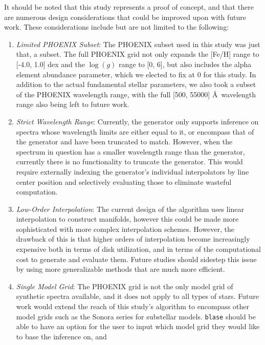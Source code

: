 \documentclass[twocolumn]{aastex631}
\begin{document}
It should be noted that this study represents a proof of concept, and that 
there are numerous design considerations that could be improved upon with 
future work. These considerations include but are not limited to the 
following:
\begin{enumerate}[label=-]
    \item \textit{Limited PHOENIX Subset}: The PHOENIX subset used in this 
    study was just that, a subset. The full PHOENIX grid not only expands 
    the [Fe/H] range to [-4.0, 1.0] dex and the $\log(g)$ range to [0, 6], 
    but also includes the alpha element abundance parameter, which we 
    elected to fix at 0 for this study. In addition to the actual fundamental 
    stellar parameters, we also took a subset of the PHOENIX wavelength range, 
    with the full [500, 55000] \AA \ wavelength range also being left to 
    future work.
    \item \textit{Strict Wavelength Range}: Currently, the generator only 
    supports inference on spectra whose wavelength limits are either equal 
    to it, or encompass that of the generator and have been truncated to 
    match. However, when the spectrum in question has a smaller wavelength 
    range than the generator, currently there is no functionality to truncate 
    the generator. This would require externally indexing the generator's 
    individual interpolators by line center position and selectively
    evaluating those to eliminate wasteful computation.
    \item \textit{Low-Order Interpolation}: The current design of the 
    algorithm uses linear interpolation to construct manifolds, however this
    could be made more sophisticated with more complex interpolation schemes.
    However, the drawback of this is that higher orders of interpolation
    become increasingly expensive both in terms of disk utilization, and 
    in terms of the computational cost to generate and evaluate them. Future
    studies should sidestep this issue by using more generalizable methods
    that are much more efficient.
    \item \textit{Single Model Grid}: The PHOENIX grid is not the only model
    grid of synthetic spectra available, and it does not apply to all types 
    of stars. Future work would extend the reach of this study's algorithm 
    to encompass other model grids such as the Sonora series for substellar
    models. \texttt{blase} should be able to have an option for the user to 
    input which model grid they would like to base the inference on, and 

\end{enumerate}
\end{document}
